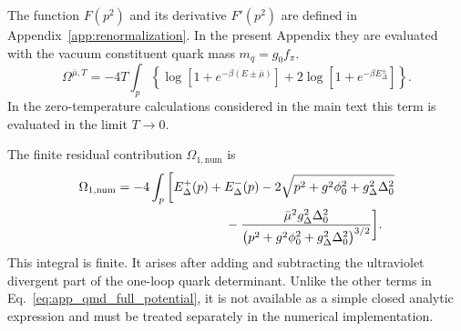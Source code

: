 The function \(F(p^2)\) and its derivative \(F'(p^2)\) are defined in
Appendix~\ref{app:renormalization}. In the present Appendix they are
evaluated with the vacuum constituent quark mass \(m_q=g_0 f_\pi\).
\begin{equation}
\Omega^{\bar{\mu},T}
=
-4T
\int_p
\left\{
\log\!\left[1+e^{-\beta(E\pm\bar{\mu})}\right]
+
2\log\!\left[1+e^{-\beta E_\Delta^\pm}\right]
\right\}.
\label{eq:app_qmd_temperature_term}
\end{equation}
In the zero-temperature calculations considered in the main text this term
is evaluated in the limit \(T\rightarrow0\).

The finite residual contribution \(\Omega_{1,\mathrm{num}}\) is
\begin{align}
\Omega_{1,\mathrm{num}}
&=
-4
\int_p
\bigg[
E_\Delta^+(p)
+
E_\Delta^-(p)
-
2\sqrt{
p^2+g^2\phi_0^2+g_\Delta^2\Delta_0^2
}
\nonumber \\
&\hspace{3.0cm}
-
\frac{
\bar{\mu}^2 g_\Delta^2\Delta_0^2
}{
\left(
p^2+g^2\phi_0^2+g_\Delta^2\Delta_0^2
\right)^{3/2}
}
\bigg].
\label{eq:app_qmd_omega_num}
\end{align}
This integral is finite. It arises after adding and subtracting the ultraviolet
divergent part of the one-loop quark determinant. Unlike the other terms
in Eq.~\eqref{eq:app_qmd_full_potential}, it is not available as a simple
closed analytic expression and must be treated separately in the numerical
implementation.
